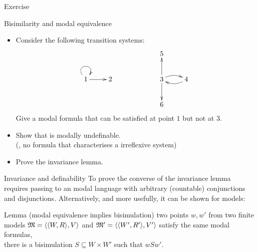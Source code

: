 \documentclass{beamer}
\begin{document}
\begin{slide}{Exercise}\label{s:32}
\small
\begin{exampleblock}{Bisimilarity and modal equivalence}
\begin{itemize}
\item Consider the following transition systems:
\begin{equation*}
\xymatrix{
&&& 5 &\\
1 \ar@(ul,ur)[]  \ar[r] & 2 & \hspace{0.3cm} & 3 \ar[u] \ar[d]  \ar@/^/[r]   & 4 \ar@/^/[l]  \\
&&& 6 &
}
\end{equation*}
Give a modal formula that can be satisfied at point $1$ but not at $3$.
\item Show that   is modally undefinable.
\\(\ie, no formula that characterises a irreflexive system)
\item Prove the invariance lemma.
\end{itemize}
\end{exampleblock}
\end{slide}

\begin{slide}{Invariance and definability}\label{s:33}
\small
To prove the converse of the invariance lemma requires passing to an  modal language  with arbitrary (countable) conjunctions and disjunctions. Alternatively, and more usefully, it can be shown  for  models:
\begin{block}{Lemma (modal equivalence implies bisimulation)}
 two points $w, w'$ from two finite models $\mathfrak{M} = \mathopen{\langle}\mathopen{\langle}W, R\mathclose{\rangle}, V\mathclose{\rangle}$ and $\mathfrak{M}' = \mathopen{\langle}\mathopen{\langle}W', R'\mathclose{\rangle}, V'\mathclose{\rangle}$ satisfy the same modal formulas,
\\
 there is a bisimulation $S \subseteq W \times W'$  such that $w S w'$.
 \end{block}
\end{slide}
\end{document}
